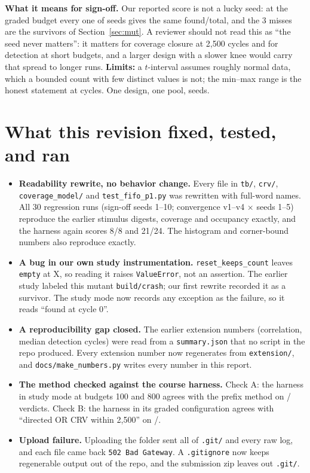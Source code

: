 \documentclass[10pt]{article}
\newcommand{\code}[1]{\texttt{#1}}
\begin{document}
\textbf{What it means for sign-off.} Our reported score is not a lucky seed: at the graded budget every one of \QtwoSeeds{} seeds gives the same found/total, and the 3 misses are the survivors of Section~\ref{sec:mut}. A reviewer should not read this as ``the seed never matters'': it matters for coverage closure at 2,500 cycles and for detection at short budgets, and a larger design with a slower knee would carry that spread to longer runs. \textbf{Limits:} a $t$-interval assumes roughly normal data, which a bounded count with few distinct values is not; the min--max range is the honest statement at \QtwoBudgetShort{} cycles. One design, one pool, \QtwoSeeds{} seeds.

\section{What this revision fixed, tested, and ran}\label{sec:revision}
\begin{itemize}
\item \textbf{Readability rewrite, no behavior change.} Every file in \code{tb/}, \code{crv/}, \code{coverage\_model/} and \code{test\_fifo\_p1.py} was rewritten with full-word names. All 30 regression runs (sign-off seeds 1--10; convergence v1--v4 $\times$ seeds 1--5) reproduce the earlier stimulus digests, coverage and occupancy exactly, and the harness again scores 8/8 and 21/24. The histogram and corner-bound numbers also reproduce exactly.
\item \textbf{A bug in our own study instrumentation.} \code{reset\_keeps\_count} leaves \code{empty} at X, so reading it raises \code{ValueError}, not an assertion. The earlier study labeled this mutant \code{build/crash}; our first rewrite recorded it as a survivor. The study mode now records any exception as the failure, so it reads ``found at cycle 0''.
\item \textbf{A reproducibility gap closed.} The earlier extension numbers (correlation, median detection cycles) were read from a \code{summary.json} that no script in the repo produced. Every extension number now regenerates from \code{extension/}, and \code{docs/make\_numbers.py} writes every number in this report.
\item \textbf{The method checked against the course harness.} Check A: the harness in study mode at budgets 100 and 800 agrees with the prefix method on \CrossAagree/\CrossAtotal{} verdicts. Check B: the harness in its graded configuration agrees with ``directed OR CRV within 2,500'' on \CrossBagree/\CrossBtotal.
\item \textbf{Upload failure.} Uploading the folder sent all of \code{.git/} and every raw log, and each file came back \code{502 Bad Gateway}. A \code{.gitignore} now keeps regenerable output out of the repo, and the submission zip leaves out \code{.git/}.
\end{itemize}
\end{document}
